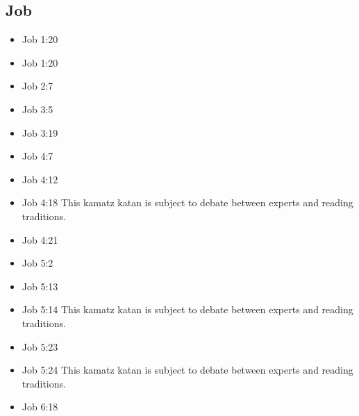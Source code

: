 \documentclass[14pt]{article}
\begin{document}
							\subsection{Job}
							\begin{multicols}{2}\begin{itemize}
									
									\item Job 1:20
									
									\item Job 1:20
									
									\item Job 2:7
									
									\item Job 3:5
									
									\item Job 3:19
									
									\item Job 4:7
									
									\item Job 4:12
									
									\item Job 4:18 This kamatz katan is subject to debate between experts and reading traditions.
									
									\item Job 4:21
									
									\item Job 5:2
									
									\item Job 5:13
									
									\item Job 5:14 This kamatz katan is subject to debate between experts and reading traditions.
									
									\item Job 5:23
									
									\item Job 5:24 This kamatz katan is subject to debate between experts and reading traditions.
									
									\item Job 6:18
									

\end{itemize}
\end{multicols}
\end{document}
